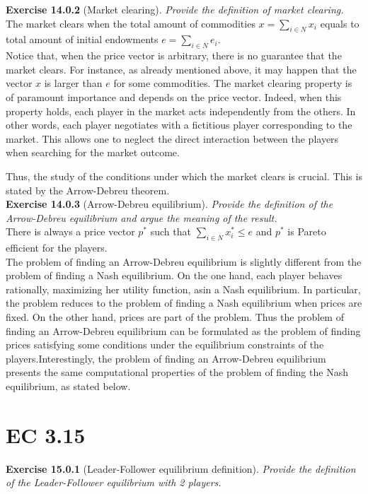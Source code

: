 \textbf{Exercise 14.0.2} (Market clearing). \textit{Provide the definition of market clearing.}\\

The market clears when the total amount of commodities $x=\sum_{i \in N} x_{i}$ equals to total amount of initial endowments $e=\sum_{i \in N} e_{i}$.\\
Notice that, when the price vector is arbitrary, there is no guarantee that the market clears. For instance, as already mentioned above, it may happen that the vector $x$ is larger than $e$ for some commodities. The market clearing property is of paramount importance and depends on the price vector. Indeed, when this property holds, each player in the market acts independently from the others. In other words, each player negotiates with a fictitious player corresponding to the market. This allows one to neglect the direct interaction between the players when searching for the market outcome.

Thus, the study of the conditions under which the market clears is crucial. This is stated by the Arrow-Debreu theorem.\\

\textbf{Exercise 14.0.3} (Arrow-Debreu equilibrium). \textit{Provide the definition of the Arrow-Debreu equilibrium and argue the meaning of the result.}\\

There is always a price vector $p^{*}$ such that $\sum_{i \in N} x_{i}^{*} \leqslant e$ and $p^{*}$ is Pareto efficient for the players.\\
The problem of finding an Arrow-Debreu equilibrium is slightly different from the problem of finding a Nash equilibrium. On the one hand, each player behaves rationally, maximizing her utility function, asin a Nash equilibrium. In particular, the problem reduces to the problem of finding a Nash equilibrium when prices are fixed. On the other hand, prices are part of the problem. Thus the problem of finding an Arrow-Debreu equilibrium can be formulated as the problem of finding prices satisfying some conditions under the equilibrium constraints of the players.Interestingly, the problem of finding an Arrow-Debreu equilibrium presents the same computational properties of the problem of finding the Nash equilibrium, as stated below.

\section{EC 3.15}
\textbf{Exercise 15.0.1} (Leader-Follower equilibrium definition). \textit{Provide the definition of the Leader-Follower equilibrium with 2 players.}\\

